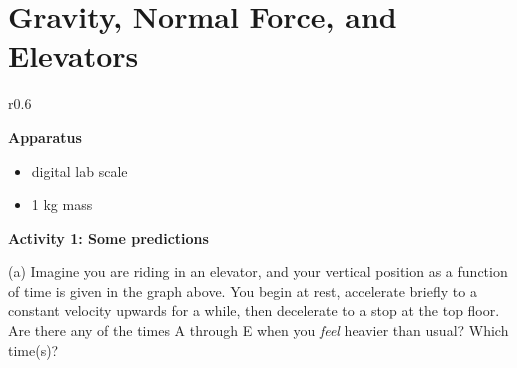 \section{Gravity, Normal Force, and Elevators}

\begin{comment}
This lab is based on an activity I've done in class for several years.  This year, I'll try for the first time to write it as a somewhat structured series of written questions.  We'll see how this works!   --Matt Trawick, 9/2019

\end{comment}

\makelabheader %

\begin{wrapfigure}[4]{r}{0.6\textwidth}
\end{wrapfigure}

\medskip
\bigskip
\textbf{Apparatus}

\begin{itemize}[nosep]
\item digital lab scale
\item 1 kg mass
\end{itemize}

\medskip
\bigskip
\textbf{Activity 1: Some predictions}

(a) Imagine you are riding in an elevator, and your vertical position as a function of time is given in the graph above.  You begin at rest, accelerate briefly to a constant velocity upwards for a while, then decelerate to a stop at the top floor.  Are there any of the times A through E when you \textit{feel} heavier than usual?  Which time(s)?
\answerspace{0.4in}


